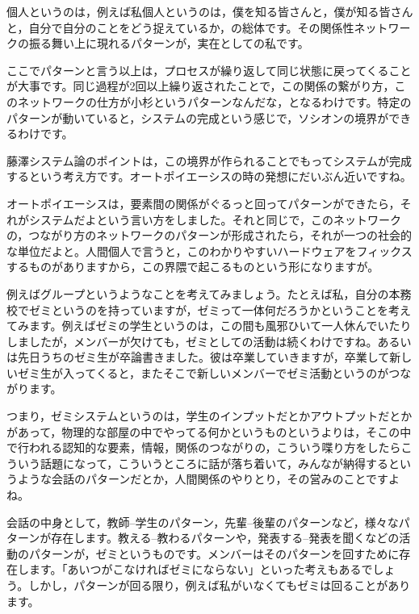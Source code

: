 \documentclass{ltjsbook}
\begin{document}
個人というのは，例えば私個人というのは，僕を知る皆さんと，僕が知る皆さんと，自分で自分のことをどう捉えているか，の総体です。その関係性ネットワークの振る舞い上に現れるパターンが，実在としての私です。

ここでパターンと言う以上は，プロセスが繰り返して同じ状態に戻ってくることが大事です。同じ過程が2回以上繰り返されたことで，この関係の繋がり方，このネットワークの仕方が小杉というパターンなんだな，となるわけです。特定のパターンが動いていると，システムの完成という感じで，ソシオンの境界ができるわけです。

藤澤システム論のポイントは，この境界が作られることでもってシステムが完成するという考え方です。オートポイエーシスの時の発想にだいぶん近いですね。

オートポイエーシスは，要素間の関係がぐるっと回ってパターンができたら，それがシステムだよという言い方をしました。それと同じで，このネットワークの，つながり方のネットワークのパターンが形成されたら，それが一つの社会的な単位だよと。人間個人で言うと，このわかりやすいハードウェアをフィックスするものがありますから，この界隈で起こるものという形になりますが。

例えばグループというようなことを考えてみましょう。たとえば私，自分の本務校でゼミというのを持っていますが，ゼミって一体何だろうかということを考えてみます。例えばゼミの学生というのは，この間も風邪ひいて一人休んでいたりしましたが，メンバーが欠けても，ゼミとしての活動は続くわけですね。あるいは先日うちのゼミ生が卒論書きました。彼は卒業していきますが，卒業して新しいゼミ生が入ってくると，またそこで新しいメンバーでゼミ活動というのがつながります。

つまり，ゼミシステムというのは，学生のインプットだとかアウトプットだとかがあって，物理的な部屋の中でやってる何かというものというよりは，そこの中で行われる認知的な要素，情報，関係のつながりの，こういう喋り方をしたらこういう話題になって，こういうところに話が落ち着いて，みんなが納得するというような会話のパターンだとか，人間関係のやりとり，その営みのことですよね。

会話の中身として，教師--学生のパターン，先輩--後輩のパターンなど，様々なパターンが存在します。教える--教わるパターンや，発表する--発表を聞くなどの活動のパターンが，ゼミというものです。メンバーはそのパターンを回すために存在します。「あいつがこなければゼミにならない」といった考えもあるでしょう。しかし，パターンが回る限り，例えば私がいなくてもゼミは回ることがあります。
\end{document}
